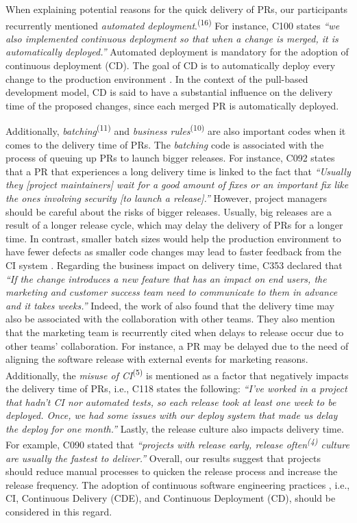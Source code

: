 When explaining potential reasons for the quick delivery of PRs, our participants recurrently mentioned \textit{automated deployment}.\textsuperscript{(16)} For instance, C100 states \textit{``we also implemented continuous deployment so that when a change is merged, it is automatically deployed.''} 
Automated deployment is mandatory for the adoption of continuous deployment (CD). The goal of CD is to automatically deploy every change to the production environment \citep{shahin2017continuous}. In the context of the pull-based development model, CD is said to have a substantial influence on the delivery time of the proposed changes, since each merged PR is automatically deployed.	

Additionally, \textit{batching}\textsuperscript{(11)} and \textit{business rules}\textsuperscript{(10)} are also important codes when it comes to the delivery time of PRs. The \textit{batching} code is associated with the process of queuing up PRs to launch bigger releases. For instance, C092 states that a PR that experiences a long delivery time is linked to the fact that \textit{``Usually they [project maintainers] wait for a good amount of fixes or an important fix like the ones involving security [to launch a release].''} 
However, project managers should be careful about the risks of bigger releases. Usually, big releases are a result of a longer release cycle, which may delay the delivery of PRs for a longer time. In contrast, smaller batch sizes would help the production environment to have fewer defects as smaller code changes may lead to faster feedback from the CI system \citep{neely2013continuous}.
Regarding the business impact on delivery time, C353 declared that \textit{``If the change introduces a new feature that has an impact on end users, the marketing and customer success team need to communicate to them in advance and it takes weeks.''} Indeed, the work of \cite{daCosta2018impact} also found that the delivery time may also be associated with the collaboration with other teams. They also mention that the marketing team is recurrently cited when delays to release occur due to other teams' collaboration. For instance, a PR may be delayed due to the need of aligning the software release with external events for marketing reasons. 
Additionally, the \textit{misuse of CI}\textsuperscript{(5)} is mentioned as a factor that negatively impacts the delivery time of PRs, i.e., C118 states the following: \textit{``I've worked in a project that hadn't CI nor automated tests, so each release took at least one week to be deployed. Once, we had some issues with our deploy system that made us delay the deploy for one month.''}
Lastly, the release culture also impacts delivery time. For example, C090 stated that \textit{``projects with \textit{release early, release often}\textsuperscript{(4)} culture are usually the fastest to deliver.''} Overall, our results suggest that projects should reduce manual processes to quicken the release process and increase the release frequency. The adoption of continuous software engineering practices \citep{shahin2017continuous}, i.e., CI, Continuous Delivery (CDE), and Continuous Deployment (CD), should be considered in this regard. 

